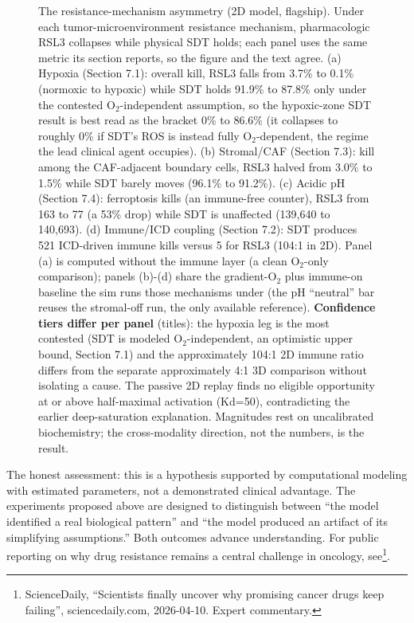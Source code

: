 \documentclass[11pt,twoside,openright]{report}
\begin{document}
\begin{figure}[tbp]
\setcounter{figure}{23}
\caption{The resistance-mechanism asymmetry (2D model, flagship). Under each tumor-microenvironment resistance mechanism, pharmacologic RSL3 collapses while physical SDT holds; each panel uses the same metric its section reports, so the figure and the text agree. (a) Hypoxia (Section 7.1): overall kill, RSL3 falls from 3.7\% to 0.1\% (normoxic to hypoxic) while SDT holds 91.9\% to 87.8\% only under the contested O$_2$-independent assumption, so the hypoxic-zone SDT result is best read as the bracket 0\% to 86.6\% (it collapses to roughly 0\% if SDT's ROS is instead fully O$_2$-dependent, the regime the lead clinical agent occupies). (b) Stromal/CAF (Section 7.3): kill among the CAF-adjacent boundary cells, RSL3 halved from 3.0\% to 1.5\% while SDT barely moves (96.1\% to 91.2\%). (c) Acidic pH (Section 7.4): ferroptosis kills (an immune-free counter), RSL3 from 163 to 77 (a 53\% drop) while SDT is unaffected (139,640 to 140,693). (d) Immune/ICD coupling (Section 7.2): SDT produces 521 ICD-driven immune kills versus 5 for RSL3 (104:1 in 2D). Panel (a) is computed without the immune layer (a clean O$_2$-only comparison); panels (b)-(d) share the gradient-O$_2$ plus immune-on baseline the sim runs those mechanisms under (the pH ``neutral'' bar reuses the stromal-off run, the only available reference). \textbf{Confidence tiers differ per panel} (titles): the hypoxia leg is the most contested (SDT is modeled O$_2$-independent, an optimistic upper bound, Section 7.1) and the approximately 104:1 2D immune ratio differs from the separate approximately 4:1 3D comparison without isolating a cause. The passive 2D replay finds no eligible opportunity at or above half-maximal activation (Kd=50), contradicting the earlier deep-saturation explanation. Magnitudes rest on uncalibrated biochemistry; the cross-modality direction, not the numbers, is the result.}
\label{fig:fig27_resistance_asymmetry}
\end{figure}

The honest assessment: this is a hypothesis supported by computational modeling with estimated parameters, not a demonstrated clinical advantage. The experiments proposed above are designed to distinguish between ``the model identified a real biological pattern'' and ``the model produced an artifact of its simplifying assumptions.'' Both outcomes advance understanding. For public reporting on why drug resistance remains a central challenge in oncology, see\footnote{ScienceDaily, ``Scientists finally uncover why promising cancer drugs keep failing'', sciencedaily.com, 2026-04-10. Expert commentary.}.
\end{document}
